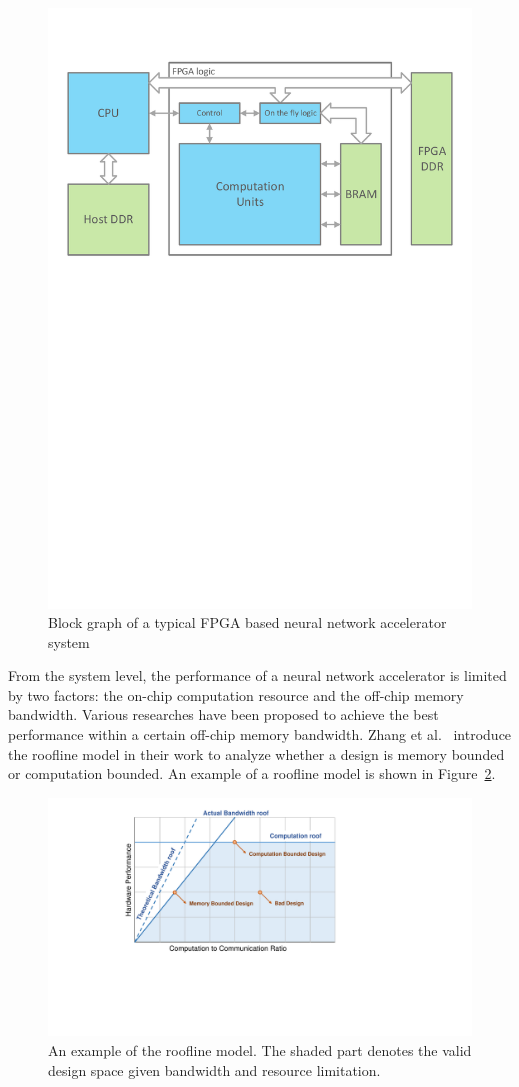 \begin{figure}[t]
    \centering
    \includegraphics[width=0.8\columnwidth]{fig/sys.pdf}
    \caption{Block graph of a typical FPGA based neural network accelerator system}
    \label{fig:sys}
\end{figure}

From the system level, the performance of a neural network accelerator is limited by two factors: the on-chip computation resource and the off-chip memory bandwidth. Various researches have been proposed to achieve the best performance within a certain off-chip memory bandwidth. Zhang et al.~\cite{zhang2015optimizing} introduce the roofline model in their work to analyze whether a design is memory bounded or computation bounded. An example of a roofline model is shown in Figure~\ref{fig:roofline}.

\begin{figure}[h]
    \centering
    \includegraphics[width=0.6\columnwidth]{fig/roofline.pdf}
    \caption{An example of the roofline model. The shaded part denotes the valid design space given bandwidth and resource limitation.}
    \label{fig:roofline}
\end{figure}

